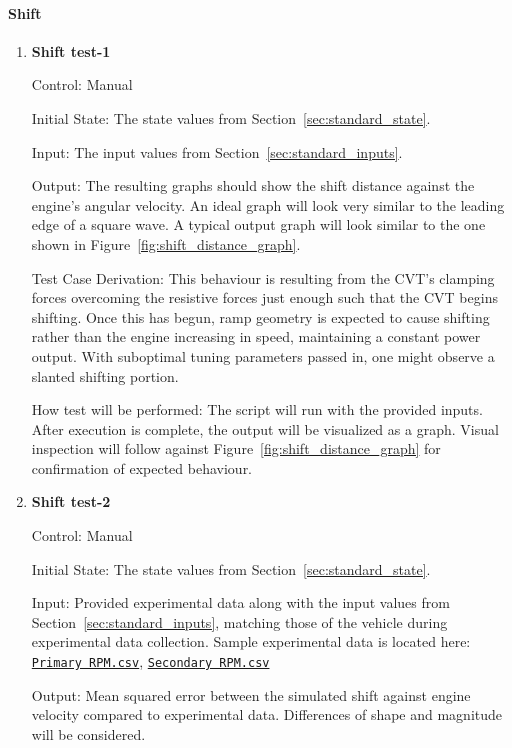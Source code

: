 \documentclass[12pt, titlepage]{article}
\newcommand{\refdata}[2]{
  \href{https://github.com/gr812b/CVT-Simulator/blob/main/experimental-data/#1
  }{\texttt{#2}}}
\begin{document}
\paragraph{Shift}

\begin{enumerate}

  \item {} \hypertarget{Shift test-1}{\textbf{Shift test-1}} \label{Shift test-1}
  
  Control: Manual
            
  Initial State: The state values from Section~\ref{sec:standard_state}.
  
  Input: The input values from Section~\ref{sec:standard_inputs}.
            
  Output: The resulting graphs should show the shift distance against the engine's angular velocity. An ideal graph will look very similar to the leading edge of a square wave. A typical output graph will look similar to the one shown in Figure~\ref{fig:shift_distance_graph}.
  
  Test Case Derivation: This behaviour is resulting from the CVT's clamping forces overcoming the resistive forces just enough such that the CVT begins shifting. Once this has begun, ramp geometry is expected to cause shifting rather than the engine increasing in speed, maintaining a constant power output. With suboptimal tuning parameters passed in, one might observe a slanted shifting portion.
  
  How test will be performed: The script will run with the provided inputs. After execution is complete, the output will be visualized as a graph. Visual inspection will follow against Figure~\ref{fig:shift_distance_graph} for confirmation of expected behaviour.
  
  \item {} \hypertarget{Shift test-2}{\textbf{Shift test-2}} \label{Shift test-2}

  Control: Manual

  Initial State: The state values from Section~\ref{sec:standard_state}.

  Input: Provided experimental data along with the input values from Section~\ref{sec:standard_inputs}, matching those of the vehicle during experimental data collection. Sample experimental data is located here: \refdata{RPM\%20PRIM.csv}{Primary RPM.csv}, \refdata{RPM\%20SEC.csv}{Secondary RPM.csv} 

  Output: Mean squared error between the simulated shift against engine velocity compared to experimental data. Differences of shape and magnitude will be considered.


\end{enumerate}
\end{document}
